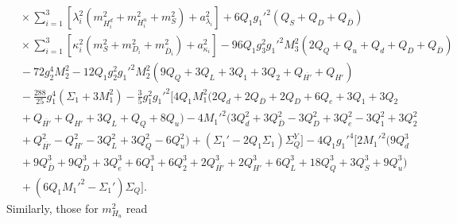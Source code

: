 \documentclass[preprint,amsmath,amssymb,aps,superscriptaddress,prd,
showpacs,floatfix,nofootinbib]{revtex4-1}
\begin{document}
\begin{subequations}
\begin{align}
& {} \times \sum_{i=1}^3 \left [ \lambda_i^2 \left ( m_{H_i^d}^2 + m_{H_i^u}^2
+ m_S^2 \right ) + a_{\lambda_i}^2 \right ] + 6 Q_1 g_1'^2 \left ( Q_S + Q_D
+ Q_{\overline{D}} \right ) \nonumber \\
& {} \times \sum_{i=1}^3 \left [ \kappa_i^2 \left ( m_S^2 + m_{D_i}^2 +
m_{\overline{D}_i}^2 \right ) + a_{\kappa_i}^2 \right ] -
96 Q_1 g_3^2 g_1'^2 M_3^2 \left ( 2 Q_Q + Q_u + Q_d + Q_D + Q_{\overline{D}}
\right ) \nonumber \\
& {} - 72 g_2^4 M_2^2 - 12 Q_1 g_2^2 g_1'^2 M_2^2 \left ( 9 Q_Q + 3 Q_L +
3 Q_1 + 3 Q_2 + Q_{\overline{H'}} + Q_{H'} \right ) \nonumber \\
& {} - \frac{288}{25} g_1^4 \left ( \Sigma_1 + 3 M_1^2 \right ) -
\frac{3}{5} g_1^2 g_1'^2 \Big [ 4 Q_1 M_1^2 \big ( 2 Q_d + 2 Q_{\overline{D}}
+ 2 Q_D + 6 Q_e + 3 Q_1 + 3 Q_2 \nonumber \\
& {} + Q_{\overline{H'}} + Q_{H'} + 3 Q_L + Q_Q + 8 Q_u \big ) - 4 M_1'^2
\big ( 3 Q_d^2 + 3 Q_{\overline{D}}^2 - 3 Q_D^2 + 3 Q_e^2 - 3 Q_1^2 +
3 Q_2^2 \nonumber \\
& {} + Q_{\overline{H'}}^2 - Q_{H'}^2 - 3 Q_L^2 + 3 Q_Q^2 - 6 Q_u^2 \big ) +
\left ( \Sigma_1' - 2 Q_1 \Sigma_1 \right ) \Sigma_Q^Y \Big ] -
4 Q_1 g_1'^4 \Big [ 2 M_1'^2 \big ( 9 Q_d^3 \nonumber \\
& {} + 9 Q_{\overline{D}}^3 + 9 Q_D^3 + 3 Q_e^3 + 6 Q_1^3 + 6 Q_2^3 +
2 Q_{\overline{H'}}^3 + 2 Q_{H'}^3 + 6 Q_L^3 + 18 Q_Q^3 + 3 Q_S^3 +
9 Q_u^3 \big ) \nonumber \\
& {} + \left ( 6 Q_1 M_1'^2 - \Sigma_1' \right ) \Sigma_Q \Big ] .
\label{eq:USSMmHd2Ot2Coeff}
\end{align}
\end{subequations}
Similarly, those for $m_{H_u}^2$ read
\end{document}
